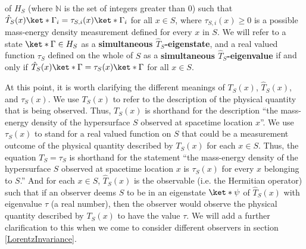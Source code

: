 \documentclass[12pt]{report}
\begin{document}
%
 of $H_S$ (where $\mathbb{N}$ is the set of integers greater than $0$) 
 such that
  $\hat{T}_S(x)\ket*{\Gamma_{i}}=\tau_{S,i}(x)\ket*{\Gamma_{i}}$ for all $x\in S$, where $\tau_{S,i}(x)\geq 0$ is  %
   a possible mass-energy density measurement defined for every $x$ in $S$. We will refer to a state $\ket*{\Gamma}\in H_S$ as a \textbf{simultaneous $\hat{T}_S$-eigenstate}, and a real valued function $\tau_S$ defined on the whole of $S$ as a  \textbf{simultaneous $\hat{T}_S$-eigenvalue} if and only if $\hat{T}_S(x)\ket*{\Gamma}=\tau_S(x)\ket*{\Gamma}$ for all $x\in S$.\label{simultaneous}

 At this point, it is worth clarifying the different meanings of $T_S(x)$, $\hat{T}_S(x)$, and $\tau_S(x)$.\label{TSclarification} We use $T_S(x)$ to refer to the description of the physical quantity that is being observed. Thus, $T_S(x)$ is shorthand for the description ``the mass-energy density of the hypersurface $S$ observed at spacetime location $x$''. We use $\tau_S(x)$ to stand for a real valued function on $S$ that could be a measurement outcome of the physical quantity described by $T_S(x)$ for each $x\in S$. Thus, the equation $T_S=\tau_S$ is shorthand for the statement ``the mass-energy density of the hypersurface $S$ observed at spacetime location $x$ is $\tau_S(x)$ for every $x$ belonging to $S$.'' And for each $x\in S$, $\hat{T}_S(x)$ is the observable (i.e. the Hermitian operator) such that if an observer deems $S$ to be in an eigenstate $\ket*{\psi}$ of  $\hat{T}_S(x)$ with eigenvalue $\tau$ (a real number), then the observer would observe the physical quantity described by  $T_S(x)$ to have the value $\tau$. We will add a further clarification to this when we come to consider different observers in section \ref{LorentzInvariance}.
\end{document}

